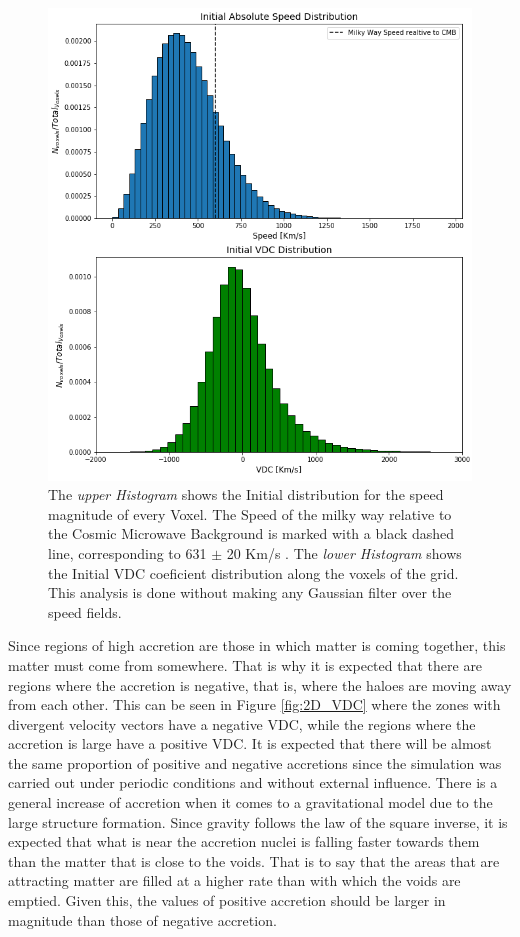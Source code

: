 \begin{figure}[!h]
    \centering
    \includegraphics[width=320pt]{V_VDC_0.png}
    \caption{ The \textit{upper Histogram} shows the Initial distribution for the speed magnitude of every Voxel. The Speed of the milky way relative to the Cosmic Microwave Background is marked with a black dashed line, corresponding to 631 $\pm$  20 Km/s . The \textit{lower Histogram} shows the Initial VDC coeficient distribution along the voxels of the grid. This analysis is done without making any Gaussian filter over the speed fields.}
    \label{fig:SpeedDistribution}
\end{figure}

Since regions of high accretion are those in which matter is coming together, this matter must come from somewhere. That is why it is expected that there are regions where the accretion is negative, that is, where the haloes are moving away from each other. This can be seen in Figure \ref{fig:2D_VDC} where the zones with divergent velocity vectors have a negative VDC, while the regions where the accretion is large have a positive VDC.
It is expected that there will be almost the same proportion of positive and negative accretions since the simulation was carried out under periodic conditions and without external influence. There is a general increase of accretion when it comes to a gravitational model due to the large structure formation. Since gravity follows the law of the square inverse, it is expected that what is near the accretion nuclei is falling faster towards them than the matter that is close to the voids. That is to say that the areas that are attracting matter are filled at a higher rate than with which the voids are emptied. Given this, the values of positive accretion should be larger in magnitude than those of negative accretion.

